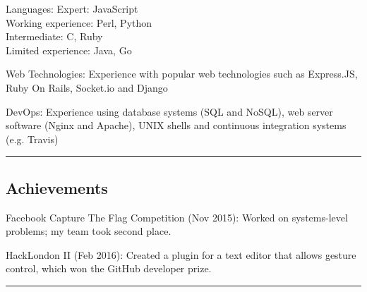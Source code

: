 \documentclass[11pt,a4paper]{article}
\newenvironment{indentsection}[1]%
{\begin{list}{}%
	{\setlength{\leftmargin}{#1}}%
	\item[]%
}
{\end{list}}
\begin{document}
\begin{indentsection}{\parindent}
\begin{description*}
	\item[Languages:]
    Expert: JavaScript\\
    Working experience: Perl, Python\\
    Intermediate: C, Ruby\\
    Limited experience: Java, Go
	\item[Web Technologies:]
	Experience with popular web technologies such as Express.JS, Ruby On Rails, Socket.io and Django
	\item[DevOps:]
	Experience using database systems (SQL and NoSQL), web server software (Nginx and Apache), UNIX shells and continuous integration systems (e.g. Travis)
\end{description*}
\end{indentsection}

\vspace{-0.4em}
\hrule
\vspace{-1.2em}
\subsection*{Achievements}
\begin{indentsection}{\parindent}
\begin{description*}
    \item[Facebook Capture The Flag Competition (Nov 2015):] Worked on systems-level problems; my team took second place.
	\item[HackLondon II (Feb 2016):] Created a plugin for a text editor that allows gesture control, which won the GitHub developer prize.
\end{description*}
\end{indentsection}

\vspace{-0.4em}
\hrule
\vspace{-1.2em}
\end{document}
